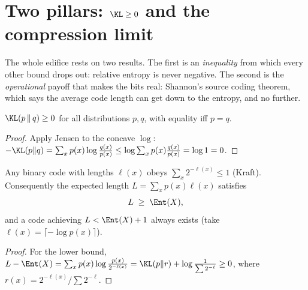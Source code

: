 \section{Two pillars: $\KL\ge0$ and the compression limit}\label{sec:source}
\quad{}

\begin{strand}
The whole edifice rests on two results. The first is an \emph{inequality} from which every other
bound drops out: relative entropy is never negative. The second is the \emph{operational} payoff
that makes the bits real: Shannon's source coding theorem, which says the average code length can
get down to the entropy, and no further.
\end{strand}


\begin{theorem}\label{thm:gibbs}
$\KL(p\,\Vert\,q)\ge 0$ for all distributions $p,q$, with equality iff $p=q$.
\end{theorem}
\begin{proof}
Apply Jensen to the concave $\log$:
$-\KL(p\Vert q)=\sum_x p(x)\log\frac{q(x)}{p(x)}\le\log\sum_x p(x)\frac{q(x)}{p(x)}=\log 1=0$.
\end{proof}



\begin{theorem}\label{thm:source}
Any binary  code with lengths $\ell(x)$ obeys $\sum_x 2^{-\ell(x)}\le 1$ (Kraft).
Consequently the expected length $L=\sum_x p(x)\ell(x)$ satisfies
\[
  L\;\ge\;\Ent(X),
\]
and a code achieving $L<\Ent(X)+1$ always exists (take $\ell(x)=\lceil-\log p(x)\rceil$).
\end{theorem}
\begin{proof}
For the lower bound, $L-\Ent(X)=\sum_x p(x)\log\frac{p(x)}{2^{-\ell(x)}}=\KL(p\Vert r)+\log\frac1{\sum 2^{-\ell}}\ge0$,
where $r(x)=2^{-\ell(x)}/\sum 2^{-\ell}$. 
\end{proof}


